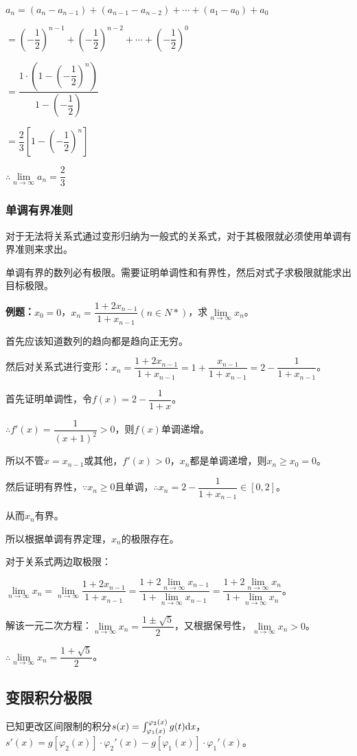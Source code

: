 \documentclass[UTF8, 12pt]{ctexart}
\begin{document}
$a_n= (a_n-a_{n-1})+(a_{n-1}-a_{n-2})+\cdots+(a_1-a_0)+a_0$\medskip

$= \left(-\dfrac{1}{2}\right)^{n-1} + \left(-\dfrac{1}{2}\right)^{n-2} + \cdots + \left(-\dfrac{1}{2}\right)^0$\medskip

$= \dfrac{1\cdot\left(1-\left(-\dfrac{1}{2}\right)^n\right)}{1-\left(-\dfrac{1}{2}\right)}$\medskip

$= \dfrac{2}{3}\left[1-\left(-\dfrac{1}{2}\right)^n\right]$\medskip

$\therefore\lim\limits_{n\to\infty}a_n=\dfrac{2}{3}$

\subsubsection{单调有界准则}

对于无法将关系式通过变形归纳为一般式的关系式，对于其极限就必须使用单调有界准则来求出。

单调有界的数列必有极限。需要证明单调性和有界性，然后对式子求极限就能求出目标极限。

\textbf{例题：}$x_0=0$，$x_n=\dfrac{1+2x_{n-1}}{1+x_{n-1}}(n\in N*)$，求$\lim\limits_{n\to\infty}x_n$。\medskip

首先应该知道数列的趋向都是趋向正无穷。

然后对关系式进行变形：$x_n=\dfrac{1+2x_{n-1}}{1+x_{n-1}}=1+\dfrac{x_{n-1}}{1+x_{n-1}}=2-\dfrac{1}{1+x_{n-1}}$。

首先证明单调性，令$f(x)=2-\dfrac{1}{1+x}$。

$\therefore f'(x)=\dfrac{1}{(x+1)^2}>0$，则$f(x)$单调递增。

所以不管$x=x_{n-1}$或其他，$f'(x)>0$，$x_n$都是单调递增，则$x_n\geqslant x_0=0$。

然后证明有界性，$\because x_n\geqslant 0$且单调，$\therefore x_n=2-\dfrac{1}{1+x_{n-1}}\in[0,2]$。

从而$x_n$有界。

所以根据单调有界定理，$x_n$的极限存在。

对于关系式两边取极限：

$\lim\limits_{n\to\infty}x_n=\lim\limits_{n\to\infty}\dfrac{1+2x_{n-1}}{1+x_{n-1}}=\dfrac{1+2\lim\limits_{n\to\infty}x_{n-1}}{1+\lim\limits_{n\to\infty}x_{n-1}}=\dfrac{1+2\lim\limits_{n\to\infty}x_n}{1+\lim\limits_{n\to\infty}x_n}$。

解该一元二次方程：$\lim\limits_{n\to\infty}x_n=\dfrac{1\pm\sqrt{5}}{2}$，又根据保号性，$\lim\limits_{n\to\infty}x_n>0$。

$\therefore\lim\limits_{n\to\infty}x_n=\dfrac{1+\sqrt{5}}{2}$。

\subsection{变限积分极限}

已知更改区间限制的积分$s(x)=\int_{\varphi_1(x)}^{\varphi_2(x)}g(t)\rm{d}\textit{x}$，$s'(x)=g[\varphi_2(x)]\cdot\varphi_2'(x)-g[\varphi_1(x)]\cdot\varphi_1'(x)$。
\end{document}

